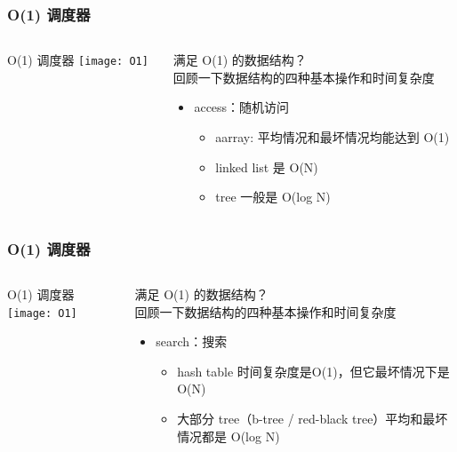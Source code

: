 \begin{frame}
	\frametitle{ O(1) 调度器}
	\begin{columns}
		\begin{column}{.4\textwidth}
			\Large \centering
			O(1) 调度器
			\texttt{[image: O1]}
			
		\end{column}
		
		\begin{column}{.6\textwidth}
			满足 O(1) 的数据结构？\\
			回顾一下数据结构的四种基本操作和时间复杂度
			\begin{itemize}
			\item access：随机访问
				\begin{itemize}
				\item aarray: 平均情况和最坏情况均能达到 O(1)
				\item linked list 是 O(N)
				\item tree 一般是 O(log N)
				\end{itemize}
			\end{itemize}
		\end{column}
	\end{columns}
\end{frame}


\begin{frame}
	\frametitle{ O(1) 调度器}
	\begin{columns}
		\begin{column}{.4\textwidth}
			\Large \centering
			O(1) 调度器
			\texttt{[image: O1]}
			
		\end{column}
		
		\begin{column}{.6\textwidth}
			满足 O(1) 的数据结构？\\
			回顾一下数据结构的四种基本操作和时间复杂度
			\begin{itemize}
				\item search：搜索
				\begin{itemize}
					\item hash table 时间复杂度是O(1)，但它最坏情况下是 O(N) 
					\item 大部分 tree（b-tree / red-black tree）平均和最坏情况都是 O(log N)
				\end{itemize}
			\end{itemize}
		\end{column}
	\end{columns}
\end{frame}


